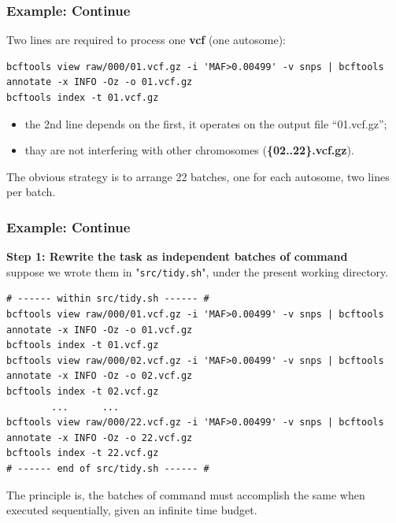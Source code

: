 \documentclass{beamer}
\begin{document}

\begin{frame}[fragile]
\frametitle{Example: Continue}
Two lines are required to process one \textbf{vcf} (one autosome):
\begin{lstlisting}
bcftools view raw/000/01.vcf.gz -i 'MAF>0.00499' -v snps | bcftools annotate -x INFO -Oz -o 01.vcf.gz
bcftools index -t 01.vcf.gz
\end{lstlisting}
\begin{itemize}
\item the 2nd line depends on the first, it operates on the output file ``01.vcf.gz'';
\item thay are not interfering with other chromosomes (\textbf{\{02..22\}.vcf.gz}).
\end{itemize}
The obvious strategy is to arrange 22 batches, one for each autosome, two lines per batch.
\end{frame}


\begin{frame}[fragile]
\frametitle{Example: Continue}
\textbf{Step 1: Rewrite the task as independent batches of command} \\
suppose we wrote them in "\verb|src/tidy.sh|", under the present working directory.
\begin{example}
\begin{lstlisting}
# ------ within src/tidy.sh ------ #
bcftools view raw/000/01.vcf.gz -i 'MAF>0.00499' -v snps | bcftools annotate -x INFO -Oz -o 01.vcf.gz
bcftools index -t 01.vcf.gz
bcftools view raw/000/02.vcf.gz -i 'MAF>0.00499' -v snps | bcftools annotate -x INFO -Oz -o 02.vcf.gz
bcftools index -t 02.vcf.gz
        ...      ...
bcftools view raw/000/22.vcf.gz -i 'MAF>0.00499' -v snps | bcftools annotate -x INFO -Oz -o 22.vcf.gz
bcftools index -t 22.vcf.gz
# ------ end of src/tidy.sh ------ #
\end{lstlisting}
\end{example}
The principle is, the batches of command must accomplish the same when executed sequentially, given an
infinite time budget.
\end{frame}

\end{document}
